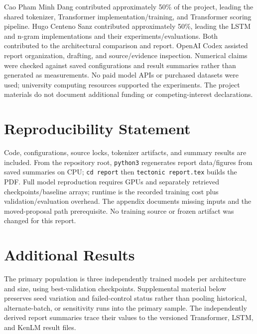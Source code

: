 \documentclass[10pt]{article}
\begin{document}
Cao Pham Minh Dang contributed approximately 50\% of the project, leading the shared tokenizer, Transformer implementation/training, and Transformer scoring pipeline. Hugo Centeno Sanz contributed approximately 50\%, leading the LSTM and n-gram implementations and their experiments/evaluations. Both contributed to the architectural comparison and report. OpenAI Codex assisted report organization, drafting, and source/evidence inspection. Numerical claims were checked against saved configurations and result summaries rather than generated as measurements. No paid model APIs or purchased datasets were used; university computing resources supported the experiments. The project materials do not document additional funding or competing-interest declarations.

\section*{Reproducibility Statement}

Code, configurations, source locks, tokenizer artifacts, and summary results are included. From the repository root, \texttt{python3}  regenerates report data/figures from saved summaries on CPU; \texttt{cd report} then \texttt{tectonic report.tex} builds the PDF. Full model reproduction requires GPUs and separately retrieved checkpoints/baseline arrays; runtime is the recorded training cost plus validation/evaluation overhead. The appendix documents missing inputs and the moved-proposal path prerequisite. No training source or frozen artifact was changed for this report.

\label{lastmainpage}
\clearpage



\clearpage
\appendix
\section{Additional Results}

The primary population is three independently trained models per architecture and size, using best-validation checkpoints. Supplemental material below preserves seed variation and failed-control status rather than pooling historical, alternate-batch, or sensitivity runs into the primary sample. The independently derived report summaries trace their values to the versioned Transformer, LSTM, and KenLM result files. 
\end{document}
